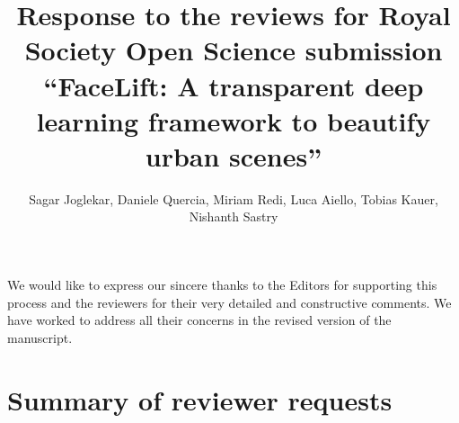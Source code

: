 \documentclass{paper}
\newenvironment{myquoteOrange}
{\definecolor{shadecolor}{rgb}{1,0.9,0.83} \begin{shaded*} \sf \em}
{\em\end{shaded*}}
\begin{document}


\title{Response to the reviews for Royal Society Open Science submission ``FaceLift: A transparent deep learning framework to beautify urban scenes''}
\author{\small Sagar Joglekar, Daniele Quercia, Miriam Redi, Luca Aiello, Tobias Kauer, Nishanth Sastry}
\maketitle

We would like to express our sincere thanks to the Editors for supporting this process and the reviewers for their very detailed and constructive comments. We have worked to address all their concerns in the revised version of the manuscript.

\section*{Summary of reviewer requests}
\end{document}
